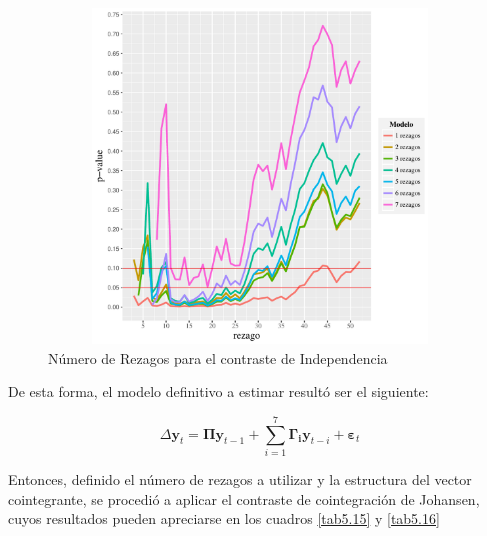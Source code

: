 \documentclass[12pt, twoside]{book}\usepackage[]{graphicx}\usepackage[]{color}
\newenvironment{knitrout}{}{} %
\numberwithin{equation}{section}
\numberwithin{theorem}{section}
\numberwithin{teorema}{section}
\numberwithin{defi}{section}
\numberwithin{prop}{section}
\numberwithin{defi}{section}
\theoremstyle{plain}
\begin{document}
\begin{knitrout}
\color{fgcolor}\begin{figure}[!htpb]

{\centering \includegraphics[width=5in,height=3.5in]{figure/unnamed-chunk-18-1} 

}

\caption{Número de Rezagos para el contraste de Independencia\label{fig5.6}}\label{fig:unnamed-chunk-18}
\end{figure}


\end{knitrout}

De esta forma, el modelo definitivo a estimar resultó ser el siguiente: 

\begin{equation}
\Delta \mathbf{y}_{t} = \boldsymbol{\Pi}\mathbf{y}_{t-1}+\sum_{i=1}^{7}\boldsymbol{\Gamma_{i}}\mathbf{y}_{t-i}+\boldsymbol{\varepsilon}_{t}
\end{equation}

Entonces, definido el número de rezagos a utilizar y la estructura del vector cointegrante, se procedió a aplicar el contraste de cointegración de Johansen, cuyos resultados pueden apreciarse en los cuadros \ref{tab5.15} y \ref{tab5.16}
\end{document}
